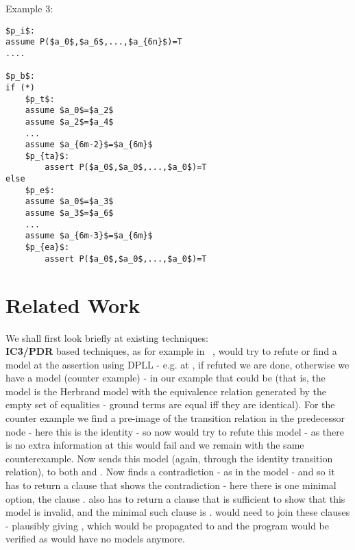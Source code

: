 \newpage

\noindent
Example 3:
\begin{lstlisting}[caption=congruence closure eager interpolant arity,label=snippet3.29]
$p_i$:
assume P($a_0$,$a_6$,...,$a_{6n}$)=T
....

$p_b$:
if (*)
	$p_t$:
	assume $a_0$=$a_2$
	assume $a_2$=$a_4$
	...
	assume $a_{6m-2}$=$a_{6m}$
	$p_{ta}$:
		assert P($a_0$,$a_0$,...,$a_0$)=T
else
	$p_e$:
	assume $a_0$=$a_3$
	assume $a_3$=$a_6$
	...
	assume $a_{6m-3}$=$a_{6m}$
	$p_{ea}$:
		assert P($a_0$,$a_0$,...,$a_0$)=T
\end{lstlisting}





\section{Related Work}
We shall first look briefly at existing techniques:\\
\textbf{IC3/PDR} based techniques, as for example in ~\cite{BjornerGurfinkelKorovinLahav2013}, would try to refute or find a model at the assertion using DPLL - e.g. at , if refuted we are done, otherwise we have a model (counter example) - in our example that could be \s{} (that is, the model is the Herbrand model with the equivalence relation generated by the empty set of equalities - ground terms are equal iff they are identical).
For the counter example we find a pre-image of the transition relation in the predecessor node - here this is the identity - so now  would try to refute this model - as there is no extra information at  this would fail and we remain with the same counterexample. 
Now  sends this model (again, through the identity transition relation), to both  and .
Now  finds a contradiction - as in the model  - and so it has to return a clause that shows the contradiction - here there is one minimal option, the clause .
 also has to return a clause that is sufficient to show that this model is invalid, and the minimal such clause is .
 would need to join these clauses - plausibly giving , which would be propagated to  and the program would be verified as  would have no models anymore.

